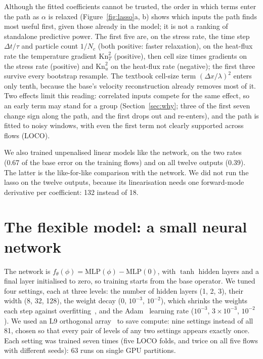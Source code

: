 \documentclass[10pt]{article}
\newcommand{\dx}{\Delta x}
\begin{document}
Although the fitted coefficients cannot be trusted, the order in which terms enter the path as
$\alpha$ is relaxed (Figure~\ref{fig:lasso}a, b) shows which inputs the path finds most useful first,
given those already in the model; it is not a ranking of standalone predictive power. The first five are, on the stress rate, the time step $\Delta t/\tau$ and particle count
$1/N_c$ (both positive: faster relaxation), on the heat-flux rate the temperature gradient
$\mathrm{Kn}_T^2$ (positive), then cell size times gradients on the stress rate (positive) and
$\mathrm{Kn}_u^2$ on the heat-flux rate (negative); the first three survive every bootstrap
resample.
The textbook cell-size term $(\dx/\lambda)^2$ enters only tenth, because the base's velocity
reconstruction already removes most of it. Two effects limit this reading: correlated inputs compete
for the same effect, so an early term may stand for a group (Section~\ref{sec:why}; three of the
first seven change sign along the path, and the first drops out and re-enters), and the path is fitted to noisy windows, with even the
first term not clearly supported across flows (LOCO).

We also trained unpenalised linear models like the network, on the two rates (0.67 of the base
error on the training flows) and on all twelve outputs (0.39). The latter is the like-for-like
comparison with the network. We did not run the lasso on the twelve outputs, because its
linearisation needs one forward-mode derivative per coefficient: 132 instead of 18.

\section{The flexible model: a small neural network}

The network is $f_\theta(\phi)=\mathrm{MLP}(\phi)-\mathrm{MLP}(0)$, with $\tanh$ hidden layers
and a final layer initialised to zero, so training starts from the base operator. We tuned four
settings, each at three levels: the number of hidden layers (1, 2, 3), their width (8, 32,
128), the weight decay (0, $10^{-3}$, $10^{-2}$), which
shrinks the weights each step against overfitting~\citep{loshchilov2019}, and the Adam~\citep{kingma2015} learning rate ($10^{-3}$,
$3\times10^{-3}$, $10^{-2}$). We used an L9 orthogonal
array~\citep{hedayat1999} to save compute: nine settings instead of all 81, chosen so that every
pair of levels of any two settings appears exactly once. Each setting was trained seven times (five LOCO
folds, and twice on all five flows with different seeds): 63 runs on single GPU partitions.
\end{document}
